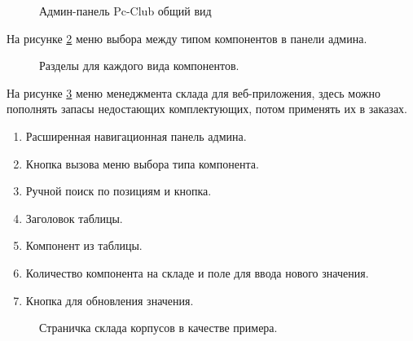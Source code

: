 \begin{figure}[ht]
\caption{Админ-панель Pc-Club общий вид}
\label{adminall:image}
\end{figure}

На рисунке \ref{razdeli:image} меню выбора между типом компонентов в панели админа.

\begin{figure}[htbp]
\caption{Разделы для каждого вида компонентов.}
\label{razdeli:image}
\end{figure}

На рисунке \ref{storedf:image} меню менеджмента склада для веб-приложения, здесь можно пополнять запасы недостающих комплектующих, потом применять их в заказах.

\begin{enumerate}
	\item Расширенная навигационная панель админа.
	\item Кнопка вызова меню выбора типа компонента.
	\item Ручной поиск по позициям и кнопка.
	\item Заголовок таблицы.
	\item Компонент из таблицы.
	\item Количество компонента на складе и поле для ввода нового значения.
	\item Кнопка для обновления значения.
\end{enumerate}

\begin{figure}[ht]
	\caption{Страничка склада корпусов в качестве примера.}
	\label{storedf:image}
\end{figure}
\clearpage
